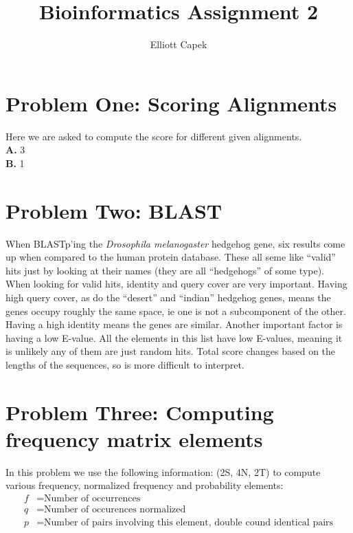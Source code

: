 \documentclass[10pt]{article} %
\title{Bioinformatics Assignment 2}
\author{Elliott Capek}
\begin{document}
\maketitle{}

\section{Problem One: Scoring Alignments}
Here we are asked to compute the score for different given alignments.\\
\textbf{A.} 3\\
\textbf{B.} 1\\

\section{Problem Two: BLAST}
When BLASTp'ing the \textit{Drosophila melanogaster} hedgehog gene, six results come up when
compared to the human protein database. These all seme like ``valid'' hits just by looking
at their names (they are all ``hedgehogs'' of some type). When looking for valid hits, identity
and query cover are very important. Having high query cover, as do the ``desert'' and ``indian''
hedgehog genes, means the genes occupy roughly the same space, ie one is not a subcomponent of
the other. Having a high identity means the genes are similar. Another important factor is having
a low E-value. All the elements in this list have low E-values, meaning it is unlikely any of
them are just random hits. Total score changes based on the lengths of the sequences, so is
more difficult to interpret.\\

\section{Problem Three: Computing frequency matrix elements}
In this problem we use the following information: (2S, 4N, 2T) to compute various frequency,
normalized frequency and probability elements:\\

\begin{align*}
  f &= \mbox{Number of occurrences}\\
  q &= \mbox{Number of occurences normalized}\\
  p &= \mbox{Number of pairs involving this element, double cound identical pairs}\\
\end{align*}
\end{document}
